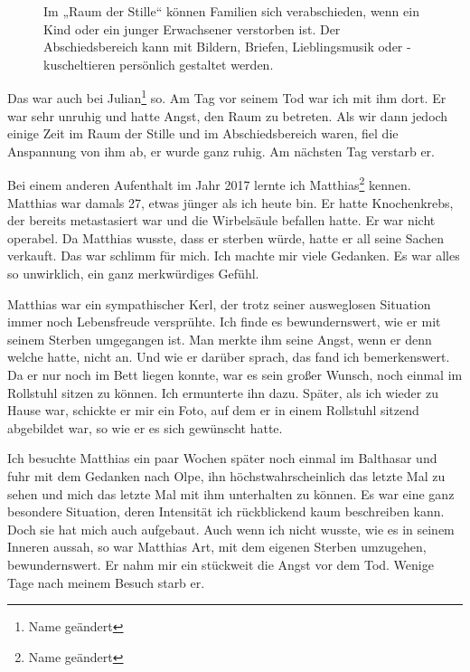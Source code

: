 \documentclass[fontsize=14pt,a4paper,headinclude,DIV=calc,automark]{scrbook}
\begin{document}
\setlength{\fboxsep}{0pt}    %
\setlength{\fboxrule}{0.2pt} %
\begin{figure}[H]
    \centering
    \caption{Im „Raum der Stille“ können Familien sich verabschieden, wenn ein Kind oder ein junger Erwachsener verstorben ist. Der Abschiedsbereich kann mit Bildern, Briefen, Lieblingsmusik oder -kuscheltieren persönlich gestaltet werden.}
    \label{fig:raum_der_stille}
\end{figure}

Das war auch bei Julian\footnote{Name geändert} so. Am Tag vor seinem Tod war ich mit ihm dort. Er war sehr unruhig und hatte Angst, den Raum zu betreten. Als wir dann jedoch einige Zeit im Raum der Stille und im Abschiedsbereich waren, fiel die Anspannung von ihm ab, er wurde ganz ruhig. Am nächsten Tag verstarb er.

Bei einem anderen Aufenthalt im Jahr 2017 lernte ich Matthias\footnote{Name geändert} kennen. Matthias war damals 27, etwas jünger als ich heute bin. Er hatte Knochenkrebs, der bereits metastasiert war und die Wirbelsäule befallen hatte. Er war nicht operabel. Da Matthias wusste, dass er sterben würde, hatte er all seine Sachen verkauft. Das war schlimm für mich. Ich machte mir viele Gedanken. Es war alles so unwirklich, ein ganz merkwürdiges Gefühl.

Matthias war ein sympathischer Kerl, der trotz seiner ausweglosen Situation immer noch Lebensfreude versprühte. Ich finde es bewundernswert, wie er mit seinem Sterben umgegangen ist. Man merkte ihm seine Angst, wenn er denn welche hatte, nicht an. Und wie er darüber sprach, das fand ich bemerkenswert. Da er nur noch im Bett liegen konnte, war es sein großer Wunsch, noch einmal im Rollstuhl sitzen zu können. Ich ermunterte ihn dazu. Später, als ich wieder zu Hause war, schickte er mir ein Foto, auf dem er in einem Rollstuhl sitzend abgebildet war, so wie er es sich gewünscht hatte.

Ich besuchte Matthias ein paar Wochen später noch einmal im Balthasar und fuhr mit dem Gedanken nach Olpe, ihn höchstwahrscheinlich das letzte Mal zu sehen und mich das letzte Mal mit ihm unterhalten zu können. Es war eine ganz besondere Situation, deren Intensität ich rückblickend kaum beschreiben kann. Doch sie hat mich auch aufgebaut. Auch wenn ich nicht wusste, wie es in seinem Inneren aussah, so war Matthias Art, mit dem eigenen Sterben umzugehen, bewundernswert. Er nahm mir ein stückweit die Angst vor dem Tod. Wenige Tage nach meinem Besuch starb er.
\end{document}
